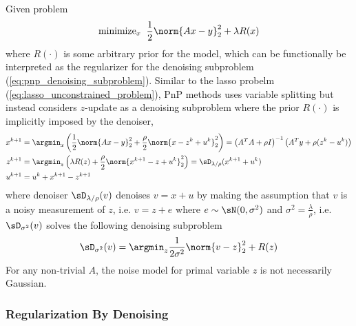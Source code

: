 \documentclass[../writeup.tex]{subfiles}
\begin{document}
Given problem 
\begin{align}
    \text{minimize}_x \;\;
        \frac{1}{2} \norm{Ax-y}_2^2 + \lambda R(x)
\end{align}
where $R(\cdot)$ is some arbitrary prior for the model, which can be functionally be interpreted as the regularizer for the denoising subproblem (\ref{eq:pnp_denoising_subproblem}). Similar to the lasso probelm (\ref{eq:lasso_unconstrained_problem}), PnP methods uses variable splitting but instead considers $z$-update as a denoising subproblem where the prior $R(\cdot)$ is implicitly imposed by the denoiser,
\begin{align} 
    x^{k+1}
        &= \argmin_x \left(
            \frac{1}{2}\norm{Ax-y}_2^2 + \frac{\rho}{2} \norm{x - z^k + u^k}_2^2
        \right)
        = \left( A^TA + \rho I \right)^{-1} \left( A^Ty + \rho(z^{k} - u^k) \right) \\
    z^{k+1}
        &= \argmin_z \left(
            \lambda R(z) + \frac{\rho}{2} \norm{x^{k+1} - z + u^k }_2^2
        \right)
        = \sD_{\lambda/\rho}( x^{k+1} + u^k ) \\
    u^{k+1}
        &= u^k + x^{k+1} - z^{k+1}
    \label{eq:pnp_admm_update_equations}
\end{align}
where denoiser $\sD_{\lambda/\rho}(v)$ denoises $v = x + u$ by making the assumption that $v$ is a noisy measurement of $z$, i.e. $v = z+e$ where $e\sim \sN(0,\sigma^2)$ and $\sigma^2 = \frac{\lambda}{\rho}$, i.e. $\sD_{\sigma^2}(v)$ solves the following denoising subproblem
\begin{align}
    \sD_{\sigma^2}(v)
        = \argmin_z
        \frac{1}{2 \sigma^2 } \norm{ v-z }_2^2 + R(z)
        \label{eq:pnp_denoising_subproblem}
\end{align}
For any non-trivial $A$, the noise model for primal variable $z$ is not necessarily Gaussian. 

\subsubsection{Regularization By Denoising}
\end{document}
